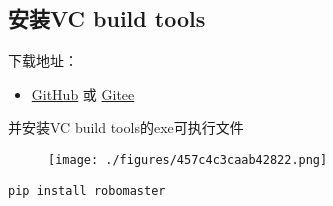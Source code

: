 
\subsection{安装VC build tools}
下载地址：\begin{itemize}
\item \href{https://github.com/dji-sdk/robomaster-sdk}{GitHub} 或 \href{https://gitee.com/xitinglin/RoboMaster-SDK}{Gitee}
\end{itemize}
并安装VC build tools的exe可执行文件
\begin{figure}[ht]
\centering
\texttt{[image: ./figures/457c4c3caab42822.png]}
\caption{} \label{fig_PyRM1_1}
\end{figure}


\begin{lstlisting}[language=pythonC]
pip install robomaster
\end{lstlisting}